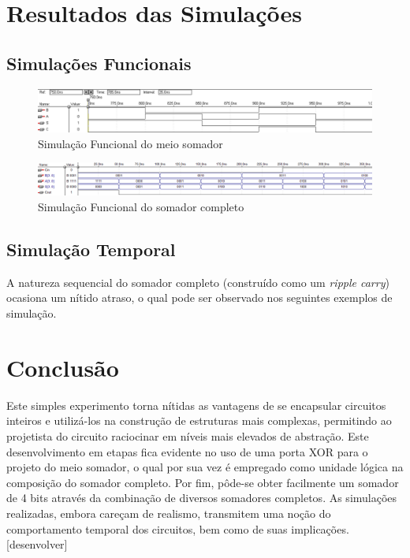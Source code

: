 \documentclass[a4paper]{article}
\begin{document}
\FloatBarrier
\section{Resultados das Simulações}

\subsection{Simulações Funcionais}
\begin{figure}[h]
  \centering
  \includegraphics[scale=0.3]{sim_func_half_adder.png}
  \caption{Simulação Funcional do meio somador}
\end{figure}

\begin{figure}[h]
  \centering
  \includegraphics[scale=0.3]{sim_func_full_adder.png}
  \caption{Simulação Funcional do somador completo}
\end{figure}


\FloatBarrier
\subsection{Simulação Temporal}
	A natureza sequencial do somador completo (construído como um \emph{ripple
carry}) ocasiona um nítido atraso, o qual pode ser observado nos seguintes
exemplos de simulação.

\FloatBarrier
\section{Conclusão}
	Este simples experimento torna nítidas as vantagens de se encapsular 
circuitos inteiros e utilizá-los na construção de estruturas mais complexas,
permitindo ao projetista do circuito raciocinar em níveis mais elevados de
abstração. Este desenvolvimento em etapas fica evidente no uso de uma porta
XOR para o projeto do meio somador, o qual por sua vez é empregado como unidade
lógica na composição do somador completo. Por fim, pôde-se obter facilmente
um somador de 4 bits através da combinação de diversos somadores completos.
	As simulações realizadas, embora careçam de realismo, transmitem uma
noção do comportamento temporal dos circuitos, bem como de suas implicações. [desenvolver]
\end{document}
